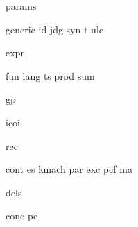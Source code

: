 {params}

{generic}
{id}
{jdg}
{syn}
{t}
{ulc}

{expr}

{fun}
{lang}
{ts}
{prod}
{sum}

{gp}

{icoi}

{rec}

{cont}
{es}
{kmach}
{par}
{exc}
{pcf}
{ma}

{dcls}

{conc}
{pc}
